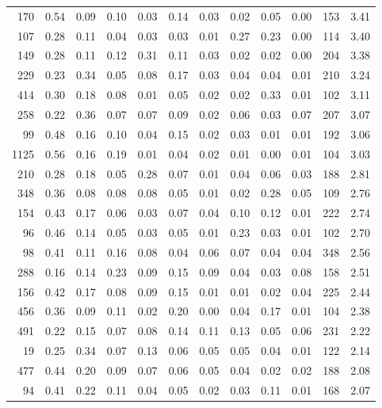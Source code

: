 \begin{tabular}{rrrrrrrrrrll}
          170 & 0.54 & 0.09 & 0.10 & 0.03 & 0.14 & 0.03 & 0.02 & 0.05 & 0.00 & 153 &  3.41 \\
          107 & 0.28 & 0.11 & 0.04 & 0.03 & 0.03 & 0.01 & 0.27 & 0.23 & 0.00 & 114 &  3.40 \\
          149 & 0.28 & 0.11 & 0.12 & 0.31 & 0.11 & 0.03 & 0.02 & 0.02 & 0.00 & 204 &  3.38 \\
          229 & 0.23 & 0.34 & 0.05 & 0.08 & 0.17 & 0.03 & 0.04 & 0.04 & 0.01 & 210 &  3.24 \\
          414 & 0.30 & 0.18 & 0.08 & 0.01 & 0.05 & 0.02 & 0.02 & 0.33 & 0.01 & 102 &  3.11 \\
          258 & 0.22 & 0.36 & 0.07 & 0.07 & 0.09 & 0.02 & 0.06 & 0.03 & 0.07 & 207 &  3.07 \\
           99 & 0.48 & 0.16 & 0.10 & 0.04 & 0.15 & 0.02 & 0.03 & 0.01 & 0.01 & 192 &  3.06 \\
         1125 & 0.56 & 0.16 & 0.19 & 0.01 & 0.04 & 0.02 & 0.01 & 0.00 & 0.01 & 104 &  3.03 \\
          210 & 0.28 & 0.18 & 0.05 & 0.28 & 0.07 & 0.01 & 0.04 & 0.06 & 0.03 & 188 &  2.81 \\
          348 & 0.36 & 0.08 & 0.08 & 0.08 & 0.05 & 0.01 & 0.02 & 0.28 & 0.05 & 109 &  2.76 \\
          154 & 0.43 & 0.17 & 0.06 & 0.03 & 0.07 & 0.04 & 0.10 & 0.12 & 0.01 & 222 &  2.74 \\
           96 & 0.46 & 0.14 & 0.05 & 0.03 & 0.05 & 0.01 & 0.23 & 0.03 & 0.01 & 102 &  2.70 \\
           98 & 0.41 & 0.11 & 0.16 & 0.08 & 0.04 & 0.06 & 0.07 & 0.04 & 0.04 & 348 &  2.56 \\
          288 & 0.16 & 0.14 & 0.23 & 0.09 & 0.15 & 0.09 & 0.04 & 0.03 & 0.08 & 158 &  2.51 \\
          156 & 0.42 & 0.17 & 0.08 & 0.09 & 0.15 & 0.01 & 0.01 & 0.02 & 0.04 & 225 &  2.44 \\
          456 & 0.36 & 0.09 & 0.11 & 0.02 & 0.20 & 0.00 & 0.04 & 0.17 & 0.01 & 104 &  2.38 \\
          491 & 0.22 & 0.15 & 0.07 & 0.08 & 0.14 & 0.11 & 0.13 & 0.05 & 0.06 & 231 &  2.22 \\
           19 & 0.25 & 0.34 & 0.07 & 0.13 & 0.06 & 0.05 & 0.05 & 0.04 & 0.01 & 122 &  2.14 \\
          477 & 0.44 & 0.20 & 0.09 & 0.07 & 0.06 & 0.05 & 0.04 & 0.02 & 0.02 & 188 &  2.08 \\
           94 & 0.41 & 0.22 & 0.11 & 0.04 & 0.05 & 0.02 & 0.03 & 0.11 & 0.01 & 168 &  2.07 \\

\end{tabular}
